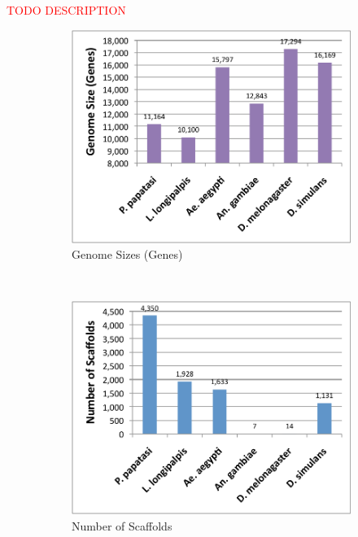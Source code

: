 \textcolor{red}{TODO DESCRIPTION}

\begin{figure}[H]
  \centering
  \begin{subfigure}[b]{0.45\textwidth}
    \includegraphics[width=\textwidth]{figures/synteny/genome_size_genes.pdf}
    \caption{Genome Sizes (Genes)}
  \end{subfigure}
  ~
  \begin{subfigure}[b]{0.45\textwidth}
    \includegraphics[width=\textwidth]{figures/synteny/scaffold_counts.pdf}
    \caption{Number of Scaffolds}
  \end{subfigure}
  ~
  \begin{subfigure}[b]{0.45\textwidth}

\end{subfigure}
\end{figure}
